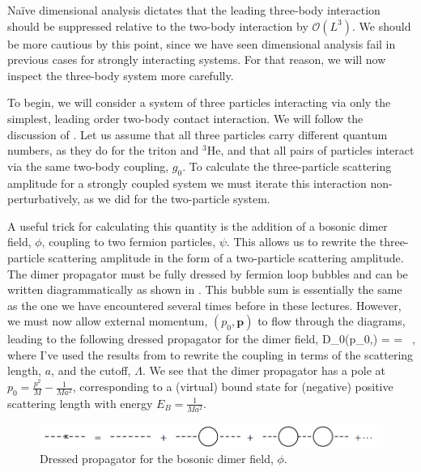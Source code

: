 Na\"ive dimensional analysis dictates that the leading three-body interaction should be suppressed relative to the two-body interaction by ${\mathcal{ O}}(L^3)$. We should be more cautious by this point, since we have seen dimensional analysis fail in previous cases for strongly interacting systems. For that reason, we will now inspect the three-body system more carefully. 

To begin, we will consider a system of three particles interacting via only the simplest, leading order two-body contact interaction. We will follow the discussion of \cite{Braaten:2004rn}. Let us assume that all three particles carry different quantum numbers, as they do for the triton and $^3$He, and that all pairs of particles interact via the same two-body coupling, $g_0$. To calculate the three-particle scattering amplitude for a strongly coupled system we must iterate this interaction non-perturbatively, as we did for the two-particle system. 

A useful trick for calculating this quantity is the addition of a bosonic dimer field, $\phi$, coupling to two fermion particles, $\psi$. This allows us to rewrite the three-particle scattering amplitude in the form of a two-particle scattering amplitude. The dimer propagator must be fully dressed by fermion loop bubbles and can be written diagrammatically as shown in . This bubble sum is essentially the same as the one we have encountered several times before in these lectures. However, we must now allow external momentum, $(p_0,\mathbf{p})$ to flow through the diagrams, leading to the following dressed propagator for the dimer field,
\beq
D_0(p_0,) =  =  \ ,
\eeq 
where I've used the results from  to rewrite the coupling in terms of the scattering length, $a$, and the cutoff, $\Lambda$. We see that the dimer propagator has a pole at $p_0=\frac{p^2}{M}-\frac{1}{Ma^2}$, corresponding to a (virtual) bound state for (negative) positive scattering length with energy $E_B=\frac{1}{Ma^2}$. 

\begin{figure}
\begin{center}
\includegraphics[width=\linewidth]{Chapter5-figures/dresseddimer}
\end{center}
\caption{\label{fig:dimerprop}Dressed propagator for the bosonic dimer field, $\phi$.}
\end{figure}


